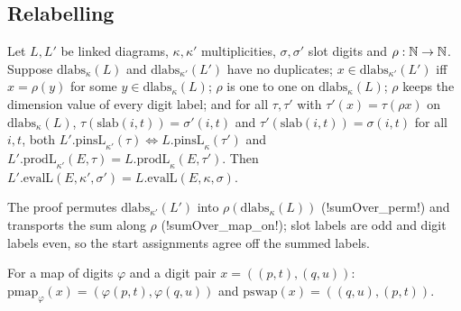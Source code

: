 \subsection{Relabelling}

\begin{theorem}\label{thm:lean-sym-relabel}
Let $L,L'$ be linked diagrams, $\kappa,\kappa'$ multiplicities, $\sigma,\sigma'$ slot digits and $\rho:\mathbb{N}\to\mathbb{N}$. Suppose $\mathrm{dlabs}_\kappa(L)$ and $\mathrm{dlabs}_{\kappa'}(L')$ have no duplicates; $x\in\mathrm{dlabs}_{\kappa'}(L')$ iff $x=\rho(y)$ for some $y\in\mathrm{dlabs}_\kappa(L)$; $\rho$ is one to one on $\mathrm{dlabs}_\kappa(L)$; $\rho$ keeps the dimension value of every digit label; and for all $\tau,\tau'$ with $\tau'(x)=\tau(\rho x)$ on $\mathrm{dlabs}_\kappa(L)$, $\tau(\mathrm{slab}(i,t))=\sigma'(i,t)$ and $\tau'(\mathrm{slab}(i,t))=\sigma(i,t)$ for all $i,t$, both $L'.\mathrm{pinsL}_{\kappa'}(\tau)\iff L.\mathrm{pinsL}_\kappa(\tau')$ and $L'.\mathrm{prodL}_{\kappa'}(E,\tau)=L.\mathrm{prodL}_\kappa(E,\tau')$. Then $L'.\mathrm{evalL}(E,\kappa',\sigma')=L.\mathrm{evalL}(E,\kappa,\sigma)$.
\end{theorem}

The proof permutes $\mathrm{dlabs}_{\kappa'}(L')$ into $\rho(\mathrm{dlabs}_\kappa(L))$ (\lean!sumOver_perm!) and transports the sum along $\rho$ (\lean!sumOver_map_on!); slot labels are odd and digit labels even, so the start assignments agree off the summed labels.

\begin{definition}
For a map of digits $\varphi$ and a digit pair $x=((p,t),(q,u))$: $\mathrm{pmap}_\varphi(x)=(\varphi(p,t),\varphi(q,u))$ and $\mathrm{pswap}(x)=((q,u),(p,t))$.
\end{definition}

